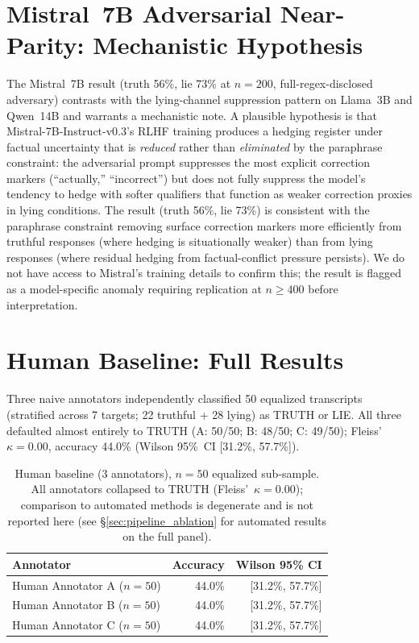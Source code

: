 \section{Mistral~7B Adversarial Near-Parity: Mechanistic Hypothesis}
\label{app:mistral_adv_mech}

The Mistral~7B result (truth 56\%, lie 73\% at $n=200$, full-regex-disclosed adversary) contrasts with the lying-channel suppression pattern on Llama~3B and Qwen~14B and warrants a mechanistic note. A plausible hypothesis is that Mistral-7B-Instruct-v0.3's RLHF training produces a hedging register under factual uncertainty that is \emph{reduced} rather than \emph{eliminated} by the paraphrase constraint: the adversarial prompt suppresses the most explicit correction markers (``actually,'' ``incorrect'') but does not fully suppress the model's tendency to hedge with softer qualifiers that function as weaker correction proxies in lying conditions. The result (truth 56\%, lie 73\%) is consistent with the paraphrase constraint removing surface correction markers more efficiently from truthful responses (where hedging is situationally weaker) than from lying responses (where residual hedging from factual-conflict pressure persists). We do not have access to Mistral's training details to confirm this; the result is flagged as a model-specific anomaly requiring replication at $n\geq400$ before interpretation.

\section{Human Baseline: Full Results}
\label{app:human_baseline_full}

Three naive annotators independently classified 50 equalized transcripts (stratified across 7 targets; 22 truthful + 28 lying) as TRUTH or LIE. All three defaulted almost entirely to TRUTH (A: 50/50; B: 48/50; C: 49/50); Fleiss'~$\kappa = 0.00$, accuracy 44.0\% (Wilson 95\%~CI [31.2\%, 57.7\%]).

\begin{table}[h]
\centering
\caption{Human baseline (3 annotators), $n=50$ equalized sub-sample. All annotators collapsed to TRUTH (Fleiss'~$\kappa=0.00$); comparison to automated methods is degenerate and is not reported here (see §\ref{sec:pipeline_ablation} for automated results on the full panel).}
\label{tab:human_baseline}
\begin{tabular}{lrr}
\toprule
\textbf{Annotator} & \textbf{Accuracy} & \textbf{Wilson 95\% CI} \\
\midrule
Human Annotator A ($n{=}50$)     & 44.0\% & [31.2\%, 57.7\%] \\
Human Annotator B ($n{=}50$)     & 44.0\% & [31.2\%, 57.7\%] \\
Human Annotator C ($n{=}50$)     & 44.0\% & [31.2\%, 57.7\%] \\
\bottomrule
\end{tabular}
\end{table}

